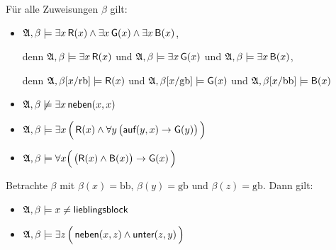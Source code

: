 \documentclass[fontsize=11pt, twoside=false, numbers=autoenddot]{scrbook}
\begin{document}
Für alle Zuweisungen $\beta$ gilt:
\par\smallskip
\begin{itemize}
  \item
    $\mathfrak{A},\beta \models \exists x\,\textsf{R}(x) \land \exists x\,\textsf{G}(x) \land \exists x\,\textsf{B}(x)$,
    \par\smallskip
    denn $\mathfrak{A},\beta \models \exists x\,\textsf{R}(x)$ und  $\mathfrak{A},\beta \models \exists x\,\textsf{G}(x)$ und $\mathfrak{A},\beta \models \exists x\,\textsf{B}(x)$,
    \par\smallskip
    denn $\mathfrak{A},\beta[x/\text{rb}] \models \textsf{R}(x)$ und  $\mathfrak{A},\beta[x/\text{gb}] \models \textsf{G}(x)$ und $\mathfrak{A},\beta[x/\text{bb}] \models \textsf{B}(x)$
    \par\smallskip
  \item
    $\mathfrak{A},\beta \not\models \exists x\,\textsf{neben}(x,x)$
    \par\smallskip
  \item
    $\mathfrak{A},\beta \models \exists x\,\Big(\,\textsf{R}(x) \land \forall y\,\big(\textsf{auf}(y,x) \to \textsf{G}(y)\big)\,\Big)$
  \item
    $\mathfrak{A},\beta \models \forall x\Big(\,\big(\textsf{R}(x) \land \textsf{B}(x)\big) \to \textsf{G}(x)\,\Big)$
\end{itemize}
\par\medskip
Betrachte $\beta$ mit $\beta(x) = \text{bb}$, $\beta(y) = \text{gb}$ und $\beta(z) = \text{gb}$. Dann gilt:
\par\smallskip
\begin{itemize}
  \item
    $\mathfrak{A},\beta \models x \neq \textsf{lieblingsblock}$
  \item
    $\mathfrak{A},\beta \models \exists z\,\Big(\,\textsf{neben}(x,z) \land \textsf{unter}(z,y)\,\Big)$
\end{itemize}
\end{document}
